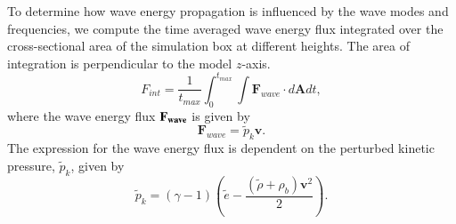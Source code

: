 \documentclass[preprint,authoryear,12pt]{elsarticle}
\begin{document}
To determine how wave energy propagation is influenced by the wave modes and frequencies, we compute the time averaged wave energy flux integrated over the cross-sectional area of the simulation box at different heights. The area of integration is perpendicular to the model $z$-axis.
\begin{equation}
F_{int}= \frac{1}{t_{max}} \int_{0}^{t_{max}} \int {\mathbf F}_{wave} \cdot d{\mathbf A}dt,
\label{e11}
\end{equation}
where the wave energy flux $\bf{F}_{wave}$ is given by
$$
{\mathbf F}_{wave}=\tilde{p}_{k} {\mathbf v}.
$$
The expression for the wave energy flux is dependent on the perturbed kinetic pressure, $\tilde{p}_{k}$, given by \citet{Bogdan2003}
$$
\tilde{p}_{k}=\left(\gamma - 1\right)\left( \tilde{e}-\frac{ \left( \tilde{\rho} +\rho_b \right){\mathbf v}^2}{2}\right).
$$
\end{document}
